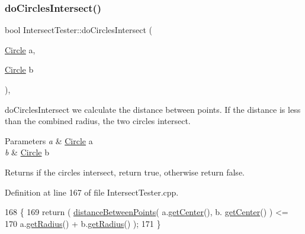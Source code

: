 \subsubsection{\texorpdfstring{do\+Circles\+Intersect()}{doCirclesIntersect()}}
{\footnotesize\ttfamily bool Intersect\+Tester\+::do\+Circles\+Intersect (\begin{DoxyParamCaption}\item[{\hyperlink{class_circle}{Circle}}]{a,  }\item[{\hyperlink{class_circle}{Circle}}]{b }\end{DoxyParamCaption})\hspace{0.3cm}{\ttfamily [static]}, {\ttfamily [private]}}



do\+Circles\+Intersect we calculate the distance between points. If the distance is less than the combined radius, the two circles intersect. 


\begin{DoxyParams}{Parameters}
{\em a} & \hyperlink{class_circle}{Circle} a \\
\hline
{\em b} & \hyperlink{class_circle}{Circle} b \\
\hline
\end{DoxyParams}
\begin{DoxyReturn}{Returns}
if the circles intersect, return true, otherwise return false. 
\end{DoxyReturn}


Definition at line 167 of file Intersect\+Tester.\+cpp.


\begin{DoxyCode}
168 \{
169     \textcolor{keywordflow}{return} ( \hyperlink{class_intersect_tester_a8eea20bc180b49008d29002fc4e2c7cf}{distanceBetweenPoints}( a.\hyperlink{class_circle_a9818ca0bbac64ff447945a8e51ff9319}{getCenter}(), b.
      \hyperlink{class_circle_a9818ca0bbac64ff447945a8e51ff9319}{getCenter}() ) <=
170              a.\hyperlink{class_circle_a95b7dc25d2e9b1e40a189cd83386a12e}{getRadius}() + b.\hyperlink{class_circle_a95b7dc25d2e9b1e40a189cd83386a12e}{getRadius}() );
171 \}
\end{DoxyCode}
\mbox{\label{class_intersect_tester_a4a2f8f6f66be1f1d432c3e04e919273f}} 
